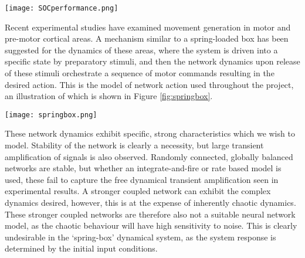 \documentclass[12pt, a4paper]{article}
\begin{document}
\FloatBarrier
\begin{SCfigure}
    \centering
    \texttt{[image: SOCperformance.png]}
    \caption{a) Activity traces from two sample neurons for the preparation and movement phase of 27 different actions. \\b) Firing rates predicted by a Stability Optimised Circuit (SOC) constructed using smoothed spectral abscissa methods for two modelled neurons, initialised to 27 different preparatory states.\\ (Figure adapted from Hennequin \emph{et al.} (2013).)}
    \label{fig:SOCdyn}
\end{SCfigure}


Recent experimental studies have examined movement generation in motor and pre-motor cortical areas\cite{Churchland2010}.  A mechanism similar to a spring-loaded box has been suggested for the dynamics of these areas, where the system is driven into a specific state by preparatory stimuli, and then the network dynamics upon release of these stimuli orchestrate a sequence of motor commands resulting in the desired action.  This is the model of network action used throughout the project, an illustration of which is shown in Figure \ref{fig:springbox}.

\begin{SCfigure}
    \centering
    \texttt{[image: springbox.png]}
    \caption{The spring-box model of cortical motor dynamics. Preparatory signals are built up to a steady state, and then free network dynamics is observed after the `go' cue. (Figure adapted from Hennequin \emph{et al.} (2013).)}
    \label{fig:springbox}
\end{SCfigure}
\FloatBarrier
These network dynamics exhibit specific, strong characteristics which we wish to model.  Stability of the network is clearly a necessity, but large transient amplification of signals is also observed.  Randomly connected, globally balanced networks are stable, but whether an integrate-and-fire or rate based model is used, these fail to capture the free dynamical transient amplification seen in experimental results\cite{Hennequin2012}.  A stronger coupled network can exhibit the complex dynamics desired, however, this is at the expense of inherently chaotic dynamics.  These stronger coupled networks are therefore also not a suitable neural network model, as the chaotic behaviour will have high sensitivity to noise.  This is clearly undesirable in the `spring-box' dynamical system, as the system response is determined by the initial input conditions.  
\end{document}
